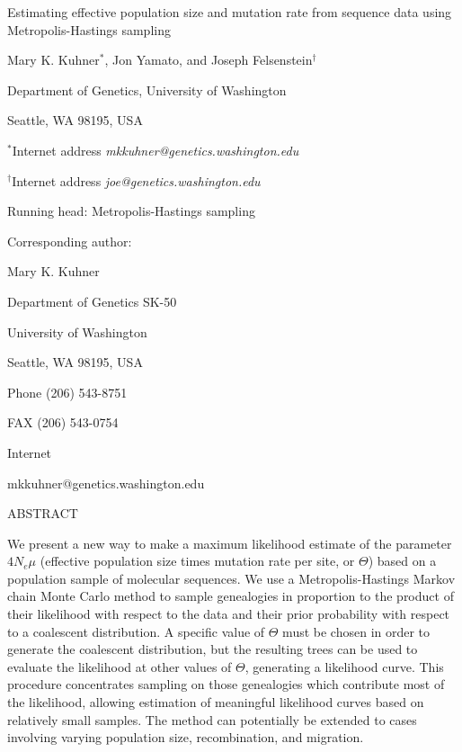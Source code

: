 \documentclass[12pt]{article}
\begin{document}
\begin{flushleft}

Estimating effective population size and mutation rate from sequence data using 
Metropolis-Hastings sampling

\bigskip
\bigskip
Mary K. Kuhner$^*$, Jon Yamato, and Joseph Felsenstein$^{\dag}$

Department of Genetics, University of Washington

Seattle, WA 98195, USA

\bigskip
$^*$Internet address {\it mkkuhner@genetics.washington.edu}

$^{\dag}$Internet address {\it joe@genetics.washington.edu}

\newpage
Running head:  Metropolis-Hastings sampling

\bigskip
Corresponding author:  
\bigskip

Mary K. Kuhner

Department of Genetics SK-50

University of Washington

Seattle, WA 98195, USA

Phone (206) 543-8751

FAX (206) 543-0754

Internet 
\begin{it}
mkkuhner@genetics.washington.edu
\end{it}

\newpage

\end{flushleft}
\begin{center}
ABSTRACT
\bigskip
\end{center}

We present a new way to make a maximum likelihood estimate of the parameter 
$4N_{e}\mu$ (effective
population size times mutation rate per site, or $\Theta$) based on a population 
sample of
molecular sequences.  We use a Metropolis-Hastings Markov chain Monte
Carlo method to
sample genealogies in proportion to the product of their likelihood with
respect to the data and their prior probability with respect to a
coalescent distribution.  A specific value of $\Theta$ must be chosen in
order to
generate the coalescent distribution, but the resulting trees can be
used to evaluate the likelihood at other values of $\Theta$,
generating a likelihood curve.  This
procedure concentrates sampling on those genealogies
which contribute most of the likelihood, allowing estimation of
meaningful likelihood curves based on relatively small samples.
The method can potentially be extended
to cases involving varying population size, recombination, and migration.
\end{document}

